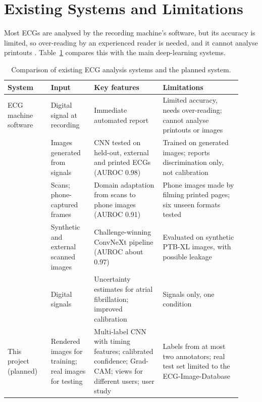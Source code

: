 \section{Existing Systems and Limitations}
\label{sec:existing-systems}

Most ECGs are analysed by the recording machine's software, but its accuracy is limited, so over-reading by an experienced reader is needed, and it cannot analyse printouts \cite{schlapfer_computer-interpreted_2017}. Table~\ref{tab:existing-systems} compares this with the main deep-learning systems.

\begin{table}[H]
  \centering
  \footnotesize
  \renewcommand{\arraystretch}{1.1}
  \caption{Comparison of existing ECG analysis systems and the planned system.}
  \label{tab:existing-systems}
  \begin{tabular}{@{}p{0.17\linewidth} p{0.17\linewidth} p{0.27\linewidth} p{0.31\linewidth}@{}}
    \toprule
    \textbf{System} & \textbf{Input} & \textbf{Key features} & \textbf{Limitations} \\
    \midrule
    ECG machine software \cite{schlapfer_computer-interpreted_2017} &
      Digital signal at recording &
      Immediate automated report &
      Limited accuracy, needs over-reading; cannot analyse printouts or images \\
    \textcite{sangha_automated_2022} &
      Images generated from signals &
      CNN tested on held-out, external and printed ECGs (AUROC 0.98) &
      Trained on generated images; reports discrimination only, not calibration \\
    \textcite{gliner_domain_2023} &
      Scans; phone-captured frames &
      Domain adaptation from scans to phone images (AUROC 0.91) &
      Phone images made by filming printed pages; six unseen formats tested \\
    \textcite{wang_pipeline_2025} &
      Synthetic and external scanned images &
      Challenge-winning ConvNeXt pipeline (AUROC about 0.97) &
      Evaluated on synthetic PTB-XL images, with possible leakage \\
    \textcite{chen_quantifying_2022} &
      Digital signals &
      Uncertainty estimates for atrial fibrillation; improved calibration &
      Signals only, one condition \\
    \midrule
    This project (planned) &
      Rendered images for training; real images for testing &
      Multi-label CNN with timing features; calibrated confidence; Grad-CAM; views for different users; user study &
      Labels from at most two annotators; real test set limited to the ECG-Image-Database \\
    \bottomrule
  \end{tabular}
\end{table}


